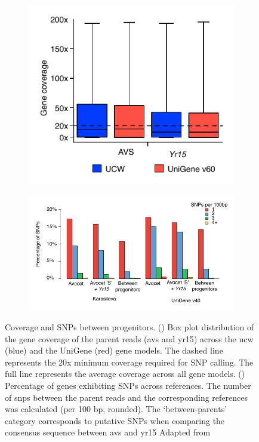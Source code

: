 \begin{figure}
\centering
\begin{subfigure}{0.75\textwidth}
    \caption{}
    \centering
     \includegraphics[height=0.25\textheight]{Yr15/Figures/CoveragePerGene.pdf} 
    \label{fig:yr15:covPerGene}
\end{subfigure}

\begin{subfigure}{0.75\textwidth}
    \caption{}
    \centering
    \includegraphics[height=0.25\textheight]{Yr15/Figures/PercentageOfSnps.pdf} 
    
    \label{fig:yr15:SNPper}
\end{subfigure}
\caption[Coverage and SNPs between progenitors]{Coverage and SNPs between progenitors. () Box plot distribution of the gene coverage of the parent reads (\gls{avs} and \gls{yr15}) across the \acrshort{ucw} (blue) and the UniGene (red) gene models. The dashed line represents the 20x minimum coverage required for SNP calling. The full line represents the average coverage across all gene models. () Percentage of genes exhibiting SNPs across references. The number of \gls{snp}s between the parent reads and the corresponding references was calculated (per 100 bp, rounded). The ‘between-parents’ category corresponds to putative SNPs when comparing the consensus sequence between \gls{avs} and \gls{yr15} Adapted from \citet{Ramirez-Gonzalez2015b} }
\end{figure}




